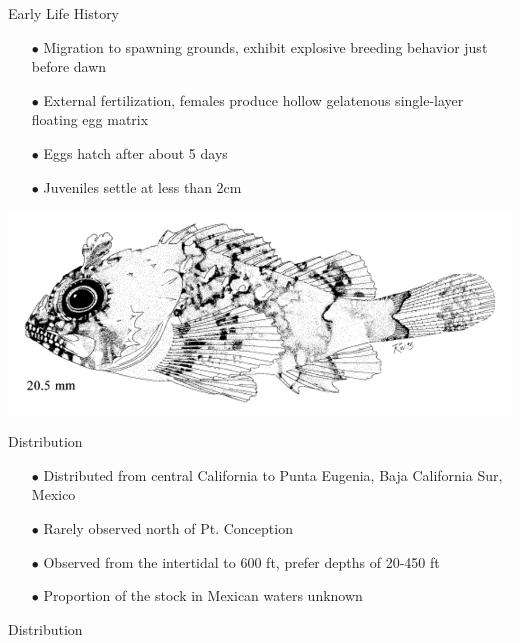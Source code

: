 \documentclass[ignorenonframetext,compress]{beamer}
\begin{document}
\begin{frame}{Early Life History}

\begin{itemize} 
\item[$\bullet$] Migration to spawning grounds, exhibit explosive breeding behavior just before dawn
\item[$\bullet$] External fertilization, females produce hollow gelatenous single-layer floating egg matrix
\item[$\bullet$] Eggs hatch after about 5 days
\item[$\bullet$] Juveniles settle at less than 2cm 
\end{itemize}

\centering
\includegraphics[width=.5\textwidth]{Figures/baby_scorp}


\end{frame}

\begin{frame}{Distribution}

\begin{itemize} 
 \item[$\bullet$] Distributed from central California to Punta Eugenia, Baja California Sur, Mexico 
 \item[$\bullet$] Rarely observed north of Pt. Conception  
 \item[$\bullet$] Observed from the intertidal to 600 ft,  prefer depths of 20-450 ft  
 \item[$\bullet$] Proportion of the stock in Mexican waters unknown
\end{itemize}

\end{frame}

\begin{frame}{Distribution}

\end{frame}
\end{document}
